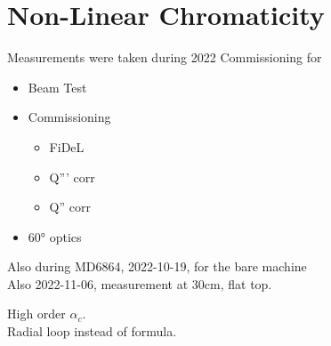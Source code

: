 \section{Non-Linear Chromaticity}

Measurements were taken during 2022 Commissioning for 
\begin{itemize}
    \item Beam Test
    \item Commissioning
    \begin{itemize}
        \item FiDeL
        \item Q''' corr
        \item Q'' corr
    \end{itemize}
    \item 60° optics
\end{itemize}

Also during MD6864, 2022-10-19, for the bare machine \\
Also 2022-11-06, measurement at 30cm, flat top.

High order $\alpha_c$. \\
Radial loop instead of formula.